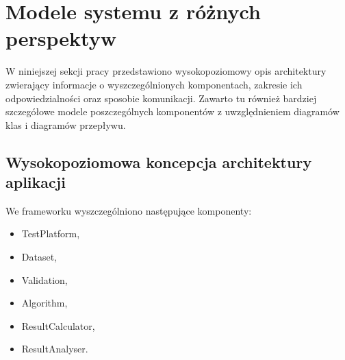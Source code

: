 \documentclass[12pt]{article}
\begin{document}
\section{Modele systemu z różnych perspektyw}

W niniejszej sekcji pracy przedstawiono wysokopoziomowy opis architektury zwierający informacje o wyszczególnionych komponentach, zakresie ich odpowiedzialności oraz sposobie komunikacji. Zawarto tu również bardziej szczegółowe modele poszczególnych komponentów z uwzględnieniem diagramów klas i diagramów przepływu.

\subsection{Wysokopoziomowa koncepcja architektury aplikacji}

We frameworku wyszczególniono następujące komponenty:

\begin{itemize}
	\item TestPlatform,
	\item Dataset,
	\item Validation,
	\item Algorithm,
	\item ResultCalculator,
	\item ResultAnalyser.
\end{itemize}
\end{document}
